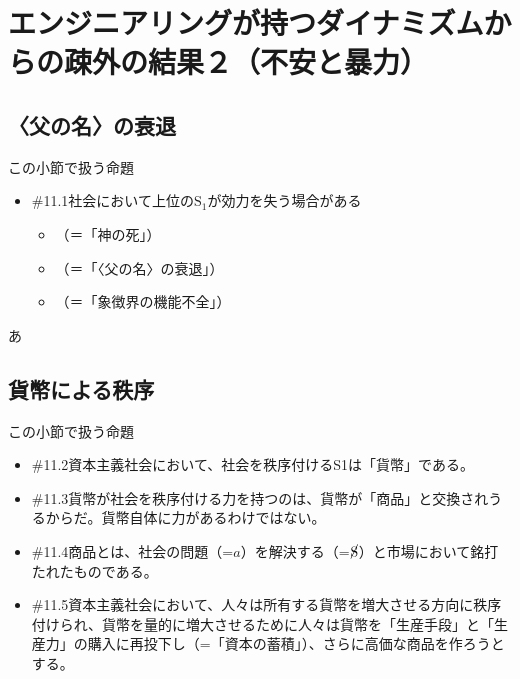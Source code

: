 \section{エンジニアリングが持つダイナミズムからの疎外の結果２（不安と暴力）}\label{ux30a8ux30f3ux30b8ux30cbux30a2ux30eaux30f3ux30b0ux304cux6301ux3064ux30c0ux30a4ux30caux30dfux30baux30e0ux304bux3089ux306eux758eux5916ux306eux7d50ux679cuxff12ux4e0dux5b89ux3068ux66b4ux529b}

\subsection{〈父の名〉の衰退}\label{ux7236ux306eux540dux306eux8870ux9000}

\begin{note}{この小節で扱う命題}
  \begin{itemize}
    \tightlist
    \item{\#11.1}社会において上位の$\textrm{S}_1$が効力を失う場合がある
      \begin{itemize}
        \tightlist
        \item （＝「神の死」）
        \item （＝「〈父の名〉の衰退」）
        \item （＝「象徴界の機能不全」）
      \end{itemize}
  \end{itemize}
\end{note}

あ

\subsection{貨幣による秩序}\label{ux8ca8ux5e63ux306bux3088ux308bux79e9ux5e8f}

\begin{note}{この小節で扱う命題}
  \begin{itemize}
    \tightlist
    \item{\#11.2}資本主義社会において、社会を秩序付けるS1は「貨幣」である。
    \item{\#11.3}貨幣が社会を秩序付ける力を持つのは、貨幣が「商品」と交換されうるからだ。貨幣自体に力があるわけではない。
    \item{\#11.4}商品とは、社会の問題（=$a$）を解決する（=$\cancel{\textrm{S}}$）と市場において銘打たれたものである。
    \item{\#11.5}資本主義社会において、人々は所有する貨幣を増大させる方向に秩序付けられ、貨幣を量的に増大させるために人々は貨幣を「生産手段」と「生産力」の購入に再投下し（=「資本の蓄積」）、さらに高価な商品を作ろうとする。
  \end{itemize}
\end{note}

